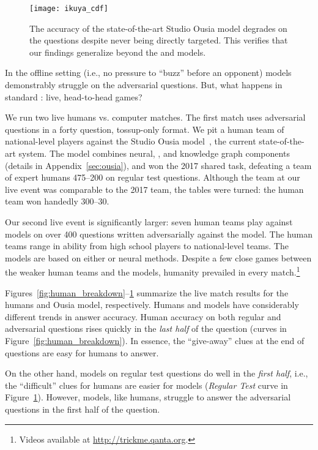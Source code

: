 \begin{figure}[t!]
\centering
\texttt{[image: ikuya\_cdf]}
\caption{The accuracy of the state-of-the-art Studio Ousia model degrades on the \challenge{} questions despite never being directly targeted. This verifies that our findings generalize beyond the  and  models.}
\label{fig:ikuya_vs_human}
\end{figure}

In the offline setting (i.e., no pressure to ``buzz'' before an opponent) models
demonstrably struggle on the adversarial questions. But, what happens in
standard \qb{}: live, head-to-head 
games? 

We run two live humans vs. computer matches. The first match uses 
adversarial questions in a forty question, tossup-only \qb{} format. 
We pit a human team of national-level \qb{} players against the
Studio Ousia model~\cite{yamada2018studio},
the current state-of-the-art \qb{} system. The model combines neural,
, and knowledge graph components (details in Appendix~\ref{sec:ousia}), and won the 2017  shared task, defeating
a team of expert humans 475--200 on regular \qb{} test questions.
Although the
team at our live event was comparable to the 
2017 team, the tables were turned: the human team won handedly 300--30.

Our second live event is significantly larger:
seven human teams play against models on over 400 questions written adversarially against the  model. The human teams range in ability from high school \qb{} players to national-level teams. The
models are based on either  or neural methods. Despite a few close games between the weaker human teams and the models, humanity prevailed in every match.\footnote{Videos available at \url{http://trickme.qanta.org}.}

Figures~\ref{fig:human_breakdown}--\ref{fig:ikuya_vs_human} summarize
the live match results for the humans and Ousia model, respectively. Humans
and models have considerably different trends in answer accuracy.
Human accuracy on both regular and adversarial questions rises
quickly in the \emph{last half}
of the question (curves in Figure~\ref{fig:human_breakdown}).
In essence, the ``give-away'' clues at the end of questions are easy for humans to answer.

On the other hand, models on regular test questions
do well in the \emph{first half}, i.e.,
the ``difficult'' clues for humans are easier for models (\emph{Regular Test} curve in Figure~\ref{fig:ikuya_vs_human}).
However, models, like humans, struggle to 
answer the adversarial questions in the first half of the question.
